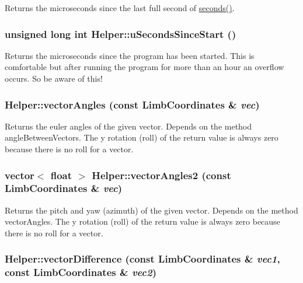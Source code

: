 \label{classHelper_ae66525ac48753d71d802b053cd9d4178}
Returns the microseconds since the last full second of \hyperlink{classHelper_a651de62f9290759d729df28b9f1d6c89}{seconds()}. \hypertarget{classHelper_a58eb1df824ee417e918d7066120886f7}{
\subsubsection[{uSecondsSinceStart}]{\setlength{\rightskip}{0pt plus 5cm}unsigned long int Helper::uSecondsSinceStart ()}}
\label{classHelper_a58eb1df824ee417e918d7066120886f7}
Returns the microseconds since the program has been started. This is comfortable but after running the program for more than an hour an overflow occurs. So be aware of this! \hypertarget{classHelper_ad2e619d55eeb5f2e727cb3fff1f16484}{
\subsubsection[{vectorAngles}]{ Helper::vectorAngles (const {\bf LimbCoordinates} \& {\em vec})}}
\label{classHelper_ad2e619d55eeb5f2e727cb3fff1f16484}
Returns the euler angles of the given vector. Depends on the method angleBetweenVectors. The y rotation (roll) of the return value is always zero because there is no roll for a vector. \hypertarget{classHelper_a0437d2944cfd6dd6b446fe14940b0518}{
\subsubsection[{vectorAngles2}]{\setlength{\rightskip}{0pt plus 5cm}vector$<$ float $>$ Helper::vectorAngles2 (const {\bf LimbCoordinates} \& {\em vec})}}
\label{classHelper_a0437d2944cfd6dd6b446fe14940b0518}
Returns the pitch and yaw (azimuth) of the given vector. Depends on the method vectorAngles. The y rotation (roll) of the return value is always zero because there is no roll for a vector. \hypertarget{classHelper_abc864cbfae3b0021fec149776b4d2ce0}{
\subsubsection[{vectorDifference}]{ Helper::vectorDifference (const {\bf LimbCoordinates} \& {\em vec1}, \/  const {\bf LimbCoordinates} \& {\em vec2})}}
